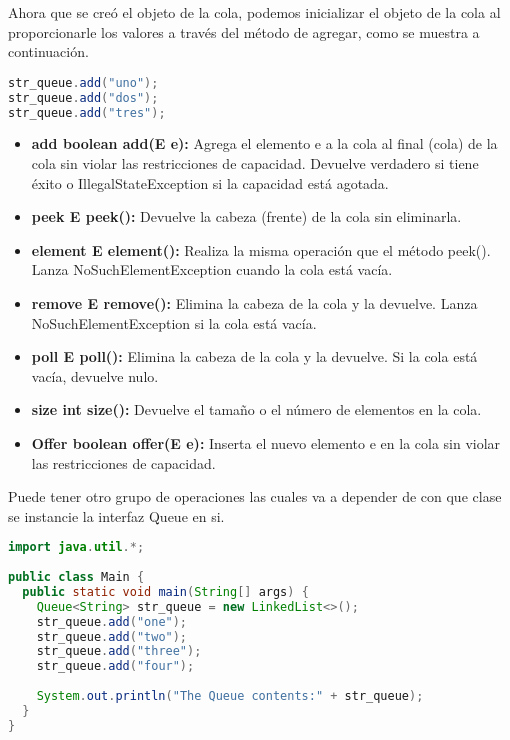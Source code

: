 Ahora que se creó el objeto de la cola, podemos inicializar el objeto de la cola al proporcionarle los valores a través del método de agregar, como se muestra a continuación.

\begin{lstlisting}[language=Java]
str_queue.add("uno");
str_queue.add("dos");
str_queue.add("tres");
\end{lstlisting}

\begin{itemize}
	\item \textbf{add boolean add(E e):} Agrega el elemento e a la cola al final (cola) de la cola sin violar las restricciones de capacidad. Devuelve verdadero si tiene éxito o IllegalStateException si la capacidad está agotada.
	\item \textbf{peek E peek():} Devuelve la cabeza (frente) de la cola sin eliminarla.
	\item \textbf{element E element():} Realiza la misma operación que el método peek(). Lanza NoSuchElementException cuando la cola está vacía.
	\item \textbf{remove E remove():} Elimina la cabeza de la cola y la devuelve. Lanza NoSuchElementException si la cola está vacía.
	\item \textbf{poll E poll():} Elimina la cabeza de la cola y la devuelve. Si la cola está vacía, devuelve nulo.
	\item \textbf{size int size():} Devuelve el tamaño o el número de elementos en la cola.
	\item \textbf{Offer	boolean offer(E e):} Inserta el nuevo elemento e en la cola sin violar las restricciones de capacidad.
\end{itemize}

Puede tener otro grupo de operaciones las cuales va a depender de con que clase se instancie la interfaz Queue en si.

\begin{lstlisting}[language=Java]
import java.util.*;
	
public class Main {
  public static void main(String[] args) {
	Queue<String> str_queue = new LinkedList<>();
	str_queue.add("one");
	str_queue.add("two");
	str_queue.add("three");
	str_queue.add("four");
			
	System.out.println("The Queue contents:" + str_queue);
  }
}
\end{lstlisting}








